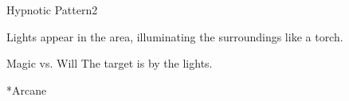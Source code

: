 \begin{spellsection}{Hypnotic Pattern}{2}
    \begin{spellheader}
    \end{spellheader}
    \begin{spellcontent}
        \begin{spelltargetinginfo}
        \end{spelltargetinginfo}
        \begin{spelleffects}
            \spelleffect Lights appear in the area, illuminating the surroundings like a torch.
            \spelldur \durshort
        \end{spelleffects}
    \end{spellcontent}
    \begin{spellsubcontent}
        \begin{spelltargetinginfo}
        \end{spelltargetinginfo}
        \begin{spelleffects}
            \begin{spellattack}{Magic vs. Will}
                \spellsuccess The target is \fascinated by the lights.
            \end{spellattack}
        \end{spelleffects}
    \end{spellsubcontent}
    \begin{spellfooter}
        *{Arcane}
        \miscastyou
    \end{spellfooter}
\end{spellsection}

